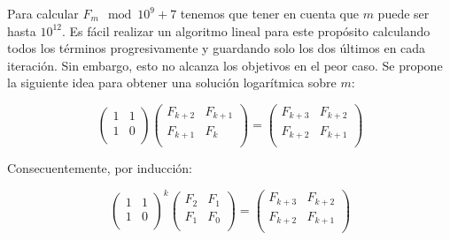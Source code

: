 \documentclass{article}
\theoremstyle{theorem-style}  %
\theoremstyle{definition}
\theoremstyle{example-style}
\begin{document}
    Para calcular $F_m \mod 10^9+7$ tenemos que tener en cuenta que $m$ puede ser hasta $10^{12}$. Es fácil realizar un algoritmo lineal para este propósito calculando todos los términos progresivamente y guardando solo los dos últimos en cada iteración. Sin embargo, esto no alcanza los objetivos en el peor caso. Se propone la siguiente idea para obtener una solución logarítmica sobre $m$:
    
    \begin{equation}
        \begin{pmatrix}
            1 & 1 \\
            1 & 0 \\
        \end{pmatrix}
        \begin{pmatrix}
            F_{k+2} & F_{k+1} \\
            F_{k+1} & F_{k} \\
        \end{pmatrix}
        =
        \begin{pmatrix}
            F_{k+3} & F_{k+2} \\
            F_{k+2} & F_{k+1} \\
        \end{pmatrix}        
    \end{equation}
    
    Consecuentemente, por inducción:
    
    \begin{equation}
        \begin{pmatrix}
            1 & 1 \\
            1 & 0 \\
        \end{pmatrix}^k
        \begin{pmatrix}
            F_{2} & F_{1} \\
            F_{1} & F_{0} \\
        \end{pmatrix}
        =
        \begin{pmatrix}
            F_{k+3} & F_{k+2} \\
            F_{k+2} & F_{k+1} \\
        \end{pmatrix}        
    \end{equation}
    
\end{document}
